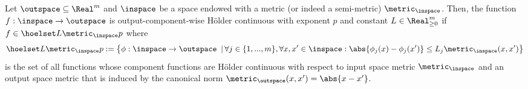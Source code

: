 \begin{defn} \label{def:outputwisehoelder}
Let $\outspace \subseteq \Real^m $ and $\inspace$ be a space endowed with a metric (or indeed a semi-metric) $\metric_\inspace$. Then, the function $f: \inspace \to \outspace$ is output-component-wise H\"older continuous with exponent $p$ and constant $L \in \Real^m_{\geq 0}$ if $f \in \hoelset L {\metric_\inspace} p$ where
\[\hoelset L {\metric_\inspace} p:= \bigl\{ \phi: \inspace \to \outspace \,\ | \, \forall j \in \{1,...,m \}, \forall x,x' \in \inspace: \abs{\phi_j(x) - \phi_j(x')} \leq L_j \metric_\inspace(x,x') \bigr\}\] 
is the set of all functions whose component functions are H\"older continuous with respect to input space metric $\metric_\inspace$ and an output space metric that is induced by the canonical norm $\metric_{\outspace} (x,x')= \abs{x-x'}$.  
\end{defn}
%
%
%
%
%
%
%
%

